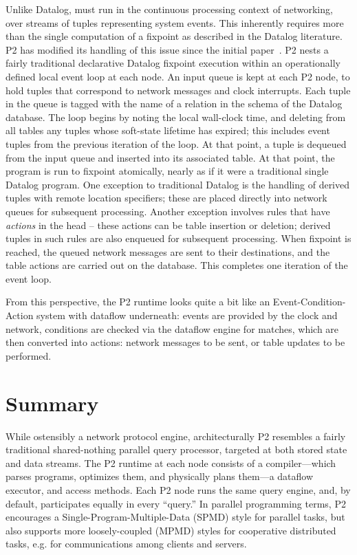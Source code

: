 Unlike Datalog, \OVERLOG must run in the continuous processing context of
networking, over streams of tuples representing system events.  This inherently
requires more than the single computation of a fixpoint as described in the
Datalog literature.  P2 has modified its handling of this issue since the
initial paper~\cite{p2:sosp}.  P2 nests a fairly traditional declarative
Datalog fixpoint execution within an operationally defined local event loop at
each node.  An input queue is kept at each P2 node, to hold tuples that
correspond to network messages and clock interrupts.  Each tuple in the queue
is tagged with the name of a relation in the schema of the Datalog database.
The loop begins by noting the local wall-clock time, and deleting from all
tables any tuples whose soft-state lifetime has expired; this includes event
tuples from the previous iteration of the loop.  At that point, a tuple is
dequeued from the input queue and inserted into its associated table.  At that
point, the \OVERLOG program is run to fixpoint atomically, nearly as if it were
a traditional single Datalog program.  One exception to traditional Datalog is
the handling of derived tuples with remote location specifiers; these are
placed directly into network queues for subsequent processing.  Another
exception involves rules that have {\em actions} in the head -- these actions
can be table insertion or deletion; derived tuples in such rules are also
enqueued for subsequent processing.  When fixpoint is reached, the queued
network messages are sent to their destinations, and the table actions are
carried out on the database.  This completes one iteration of the event loop.

From this perspective, the P2 runtime looks quite a bit like an
Event-Condition-Action system with dataflow underneath: events are provided by
the clock and network, conditions are checked via the dataflow engine for
matches, which are then converted into actions: network messages to be sent, or
table updates to be performed.

\section{Summary}
\label{ch:p2:sec:summary}

While ostensibly a network protocol engine, architecturally P2 resembles a
fairly traditional shared-nothing parallel query processor, targeted at both
stored state and data streams.  The P2 runtime at each node consists of a
compiler---which parses programs, optimizes them, and physically plans them---a
dataflow executor, and access methods.  Each P2 node runs the same query
engine, and, by default, participates equally in every ``query.'' In parallel
programming terms, P2 encourages a Single-Program-Multiple-Data (SPMD) style
for parallel tasks, but also supports more loosely-coupled (MPMD) styles for
cooperative distributed tasks, e.g.  for communications among clients and
servers.


